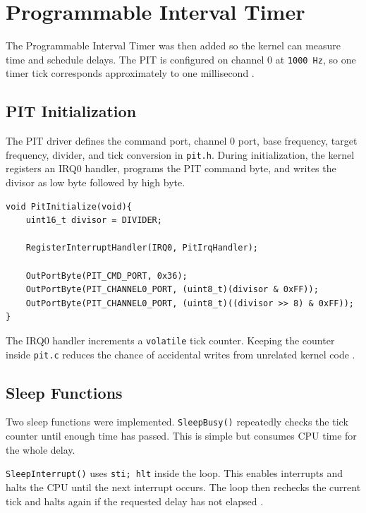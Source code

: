\section{Programmable Interval Timer}

The Programmable Interval Timer was then added so the kernel can measure time and schedule delays. The PIT is configured on channel 0 at \texttt{1000 Hz}, so one timer tick corresponds approximately to one millisecond \cite{osdevPit}.

\subsection{PIT Initialization}
The PIT driver defines the command port, channel 0 port, base frequency, target frequency, divider, and tick conversion in \texttt{pit.h}. During initialization, the kernel registers an IRQ0 handler, programs the PIT command byte, and writes the divisor as low byte followed by high byte\cite{assignmentFiles,osdevPit}.

\begin{listing}[H]
\begin{verbatim}
void PitInitialize(void){
    uint16_t divisor = DIVIDER;

    RegisterInterruptHandler(IRQ0, PitIrqHandler);

    OutPortByte(PIT_CMD_PORT, 0x36);
    OutPortByte(PIT_CHANNEL0_PORT, (uint8_t)(divisor & 0xFF));
    OutPortByte(PIT_CHANNEL0_PORT, (uint8_t)((divisor >> 8) & 0xFF));
}
\end{verbatim}
\caption{PIT channel 0 initialization and IRQ0 handler registration.}
\end{listing}

The IRQ0 handler increments a \texttt{volatile} tick counter. Keeping the counter inside \texttt{pit.c} reduces the chance of accidental writes from unrelated kernel code \cite{assignmentFiles,osdevPit}.

\subsection{Sleep Functions}
Two sleep functions were implemented. \texttt{SleepBusy()} repeatedly checks the tick counter until enough time has passed. This is simple but consumes CPU time for the whole delay.

\texttt{SleepInterrupt()} uses \texttt{sti; hlt} inside the loop. This enables interrupts and halts the CPU until the next interrupt occurs. The loop then rechecks the current tick and halts again if the requested delay has not elapsed \cite{assignmentFiles,intelSdm}.

